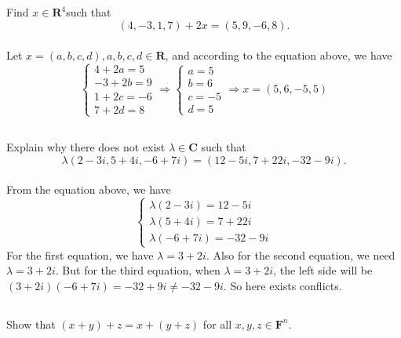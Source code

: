 \documentclass[a4paper]{article}
\begin{document}
\subsection{}
Find $x\in \bm{R}^4$such that
$$
    (4,-3,1,7)+2x=(5,9,-6,8).
$$
\paragraph{}
Let $x = (a,b,c,d), a,b,c,d\in \bm{R}$, and according to the equation above, we have
$$
    \begin{cases}
        4+2a=5  \\
        -3+2b=9 \\
        1+2c=-6 \\
        7+2d=8
    \end{cases}\Rightarrow
    \begin{cases}
        a = 5 \\
        b=6   \\
        c=-5  \\
        d = 5
    \end{cases}\Rightarrow
    x = (5,6,-5,5)
$$

\subsection{}
Explain why there does not exist $\lambda \in \mathbf{C}$ such that
\[
    \lambda(2-3 i, 5+4 i,-6+7 i)=(12-5 i, 7+22 i,-32-9 i).
\]
\paragraph{}
From the equation above, we have
\[
    \begin{cases}
        \lambda(2-3i)=12-5i \\
        \lambda(5+4i)=7+22i \\
        \lambda(-6+7i)=-32-9i
    \end{cases}
\]
For the first equation, we have $\lambda = 3+2i$.
Also for the second equation, we need $\lambda = 3+2i$.
But for the third equation, when $\lambda = 3+2i$,
the left side will be $(3+2i)(-6+7i)=-32+9i\neq-32-9i$.
So here exists conflicts.

\subsection{}
Show that $(x+y)+z=x+(y+z)$ for all $x, y, z \in \mathbf{F}^{n}$.
\end{document}
